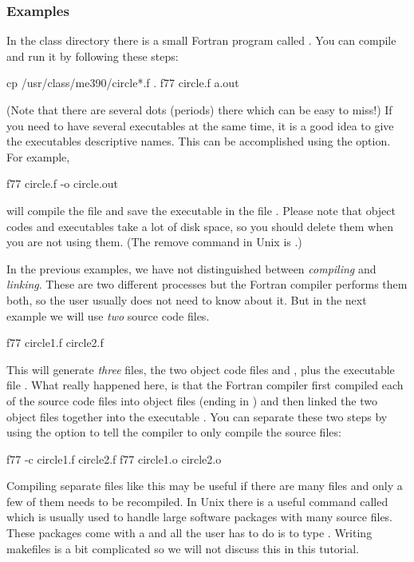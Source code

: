 \subsubsection*{Examples}

In the class directory there is a small Fortran program called
. You can compile and run it by following these
steps:

\begin{code}
    cp /usr/class/me390/circle*.f .
    f77 circle.f
    a.out
\end{code}

(Note that there are several dots (periods) there which can be easy to
miss!) If you need to have several executables at the same time, it is a
good idea to give the executables descriptive names. This can be
accomplished using the  option. For example,

\begin{code}
    f77 circle.f -o circle.out
\end{code}

will compile the file  and save the executable in
the file . Please note that object codes and
executables take a lot of disk space, so you should delete them when you
are not using them. (The remove command in Unix is .)

In the previous examples, we have not distinguished between
\textit{compiling} and \textit{linking}. These are two different
processes but the Fortran compiler performs them both, so the user
usually does not need to know about it. But in the next example we will
use \textit{two} source code files.

\begin{code}
    f77 circle1.f circle2.f
\end{code}

This will generate \textit{three} files, the two object code files
 and , plus the executable
file . What really happened here, is that the Fortran
compiler first compiled each of the source code files into object files
(ending in ) and then linked the two object files
together into the executable . You can separate these
two steps by using the  option to tell the compiler to
only compile the source files:

\begin{code}
    f77 -c circle1.f circle2.f
    f77 circle1.o circle2.o
\end{code}

Compiling separate files like this may be useful if there are many files
and only a few of them needs to be recompiled. In Unix there is a useful
command called  which is usually used to handle large
software packages with many source files. These packages come with a
 and all the user has to do is to type
. Writing makefiles is a bit complicated so we will not
discuss this in this tutorial.
